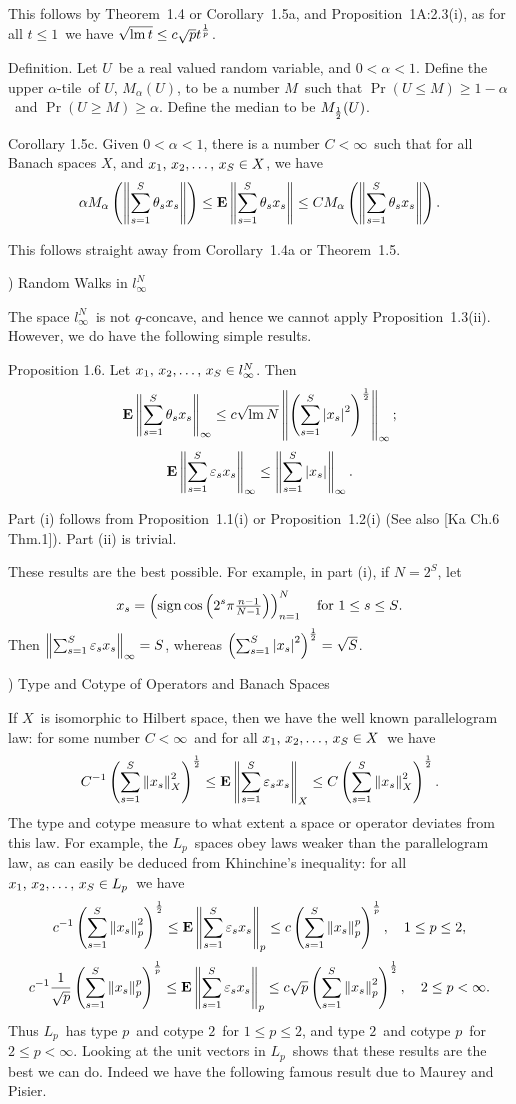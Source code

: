 \Proof This follows by Theorem~1.4 or Corollary~1.5a, and
Proposition~1A:2.3(i), as for
all $t\le1$\ we have $\sqrt{\mathop{\rm lm}\nolimits t} \le c\sqrt p t^{1\over p}$.
\endproof
 
\proclaim Definition. Let $U$\ be a real valued random variable,
and
$0<\alpha<1$. Define the {\dt upper $\alpha$-tile}\ of $U$, $M_\alpha(U)$,
to
be a number $M$\ such that $\Pr(U\le M)\ge1-\alpha$\ and $\Pr(U\ge
M)\ge \alpha$. Define the {\dt median} to be $M_{1\over2}(U)$.
 
\proclaim Corollary 1.5c. Given $0<\alpha<1$, there is a number $C<\infty$\
such
that for all Banach spaces $X$, and $\xS\in X$, we have
$$ \alpha M_\alpha\left(\left\| \sum_{s=1}^S \theta_s x_s \right\|\right)
   \le {\bf E}\left\| \sum_{s=1}^S \theta_s x_s \right\|
   \le C M_\alpha\left(\left\| \sum_{s=1}^S \theta_s x_s \right\|\right).$$
 
\Proof This follows straight away from Corollary~1.4a or Theorem~1.5.
\endproof
 
) Random Walks in $l_\infty^N$
 
The space $l_\infty^N$\ is not $q$-concave, and hence we cannot apply
Proposition~1.3(ii). However, we do have the following simple results.
 
\proclaim Proposition 1.6. Let $\xS\in l_\infty^N$. Then
$$ {\bf E}\left\| \sum_{s=1}^S \theta_s x_s \right\|_\infty \le c \sqrt{\mathop{\rm lm}\nolimits N} \left\| \left(\sum_{s=1}^S \left| x_s\right|^2\right)^{1\over2} \right\|_\infty
;$$
$$ {\bf E}\left\| \sum_{s=1}^S \varepsilon_s x_s \right\|_\infty \le \left\| \sum_{s=1}^S\left| x_s\right| \right\|_\infty .$$
 
\Proof Part (i) follows from Proposition~1.1(i) or Proposition~1.2(i)
(See also [Ka Ch.6 Thm.1]). Part (ii) is trivial.
\endproof
 
These results are the best possible. For example, in part (i), if
$N=2^S$, let
$$ x_s = \left(\mathop{\rm sign}\cos\left(2^s\pi{\textstyle{n-1\over N-1}}\right)\right)_{n=1}^N
   \quad\hbox{for $1\le s\le S$.}$$
Then $\left\| \sum_{s=1}^S \varepsilon_s x_s \right\|_\infty=S$, whereas $\left(\sum_{s=1}^S \left| x_s\right|^2\right)^{1\over2} = \sqrt S$.
 
\vfill
\eject
 
) Type and Cotype of Operators and Banach Spaces
 
If $X$\ is isomorphic to Hilbert space, then we have the
well known parallelogram law: for some number $C<\infty$\ and
for all $\xS\in X$\ we have
$$ C^{-1} \left(\sum_{s=1}^S\left\| x_s \right\|_X^2\right)^{1\over2}
   \le {\bf E}\left\| \sum_{s=1}^S \varepsilon_s x_s \right\|_X
   \le C \left(\sum_{s=1}^S\left\| x_s \right\|_X^2\right)^{1\over2} . $$
The type and cotype measure to what extent a space or operator deviates
from
this law. For example, the $L_p$\ spaces obey laws weaker than the
parallelogram
law, as can easily be deduced from Khinchine's inequality: for all
$\xS\in
L_p$\ we have
$$ c^{-1} \left(\sum_{s=1}^S\left\| x_s \right\|_p^2\right)^{1\over2}
     \le {\bf E}\left\| \sum_{s=1}^S \varepsilon_s x_s \right\|_p
       \le c \left(\sum_{s=1}^S\left\| x_s \right\|_p^p\right)^{1\over p},
         \quad 1\le p\le2, $$
$$ c^{-1} {1\over\sqrt{p}} \left(\sum_{s=1}^S\left\| x_s \right\|_p^p\right)^{1\over p}
     \le {\bf E}\left\| \sum_{s=1}^S \varepsilon_s x_s \right\|_p
       \le c \sqrt p \left(\sum_{s=1}^S\left\| x_s \right\|_p^2\right)^{1\over2},
         \quad 2\le p<\infty. $$
Thus $L_p$\ has type $p$\ and cotype $2$\ for $1\le p\le 2$, and
type $2$\ and
cotype $p$\ for $2\le p<\infty$. Looking at the unit vectors in $L_p$\
shows
that these results are the best we can do. Indeed we have the following
famous
result due to Maurey and Pisier.
 
